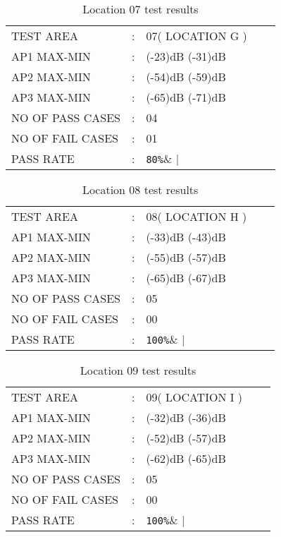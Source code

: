 \documentclass{report}
\begin{document}
	\begin{table}[H]
		\centering
		\label{LOCATION SEVEN TEST}
		\begin{tabular}{lllll}
			TEST AREA& :&  07( LOCATION G )&    \\
			AP1 MAX-MIN& :& (-23)dB (-31)dB&  \\
			AP2 MAX-MIN& :& (-54)dB (-59)dB&   \\
			AP3 MAX-MIN& :& (-65)dB (-71)dB&   \\
			NO OF PASS CASES& :& 04&  \\
			NO OF FAIL CASES& :& 01&   \\
			PASS RATE& :& \verb|80%|&   
		\end{tabular}
		\caption{Location 07 test results}
	\end{table}
	
	\begin{table}[H]
		\centering
		\label{LOCATION EIGHT TEST}
		\begin{tabular}{lllll}
			TEST AREA& :&  08( LOCATION H )&    \\
			AP1 MAX-MIN& :& (-33)dB (-43)dB&  \\
			AP2 MAX-MIN& :& (-55)dB (-57)dB&   \\
			AP3 MAX-MIN& :& (-65)dB (-67)dB&   \\
			NO OF PASS CASES& :& 05&  \\
			NO OF FAIL CASES& :& 00&   \\
			PASS RATE& :& \verb|100%|&   
		\end{tabular}
		\caption{Location 08 test results}
	\end{table}
	
	\begin{table}[H]
		\centering
		\label{LOCATION NINE TEST}
		\begin{tabular}{lllll}
			TEST AREA& :&  09( LOCATION I )&    \\
			AP1 MAX-MIN& :& (-32)dB (-36)dB&  \\
			AP2 MAX-MIN& :& (-52)dB (-57)dB&   \\
			AP3 MAX-MIN& :& (-62)dB (-65)dB&   \\
			NO OF PASS CASES& :& 05&  \\
			NO OF FAIL CASES& :& 00&   \\
			PASS RATE& :& \verb|100%|&   
		\end{tabular}
		\caption{Location 09 test results}
	\end{table}
	
\end{document}
